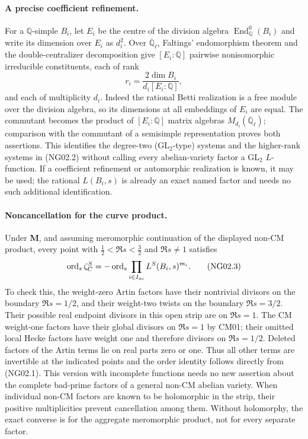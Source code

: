 \paragraph{A precise coefficient refinement.}
For a $\mathbb Q$-simple $B_i$, let $E_i$ be the centre of the division
algebra $\operatorname{End}^0_{\mathbb Q}(B_i)$ and write its dimension
over $E_i$ as $d_i^2$.  Over $\overline{\mathbb Q}_\ell$, Faltings'
endomorphism theorem and the double-centralizer decomposition give
$[E_i:\mathbb Q]$ pairwise nonisomorphic irreducible constituents, each
of rank
\[
                  r_i=\frac{2\dim B_i}{d_i[E_i:\mathbb Q]},
\]
and each of multiplicity $d_i$.  Indeed the rational Betti realization
is a free module over the division algebra, so its dimensions at all
embeddings of $E_i$ are equal.  The commutant becomes the
product of $[E_i:\mathbb Q]$ matrix algebras
$M_{d_i}(\overline{\mathbb Q}_\ell)$; comparison with the commutant of
a semisimple representation proves both assertions.  This identifies
the degree-two (GL$_2$-type) systems and the higher-rank systems in
(NG02.2) without calling every abelian-variety factor a GL$_2$
$L$-function.  If a coefficient refinement or automorphic realization
is known, it may be used; the rational $L(B_i,s)$ is already an exact
named factor and needs no such additional identification.

\paragraph{Noncancellation for the curve product.}
Under \textbf{M}, and assuming meromorphic continuation of the displayed
non-CM product, every point with
$\tfrac12<\Re s<\tfrac32$ and $\Re s\ne1$ satisfies
\[
 \operatorname{ord}_s\zeta^S_C
       =-\operatorname{ord}_s
             \prod_{i\in I_{\rm nc}}L^S(B_i,s)^{m_i}.          \tag{NG02.3}
\]
To check this, the weight-zero Artin factors have their nontrivial
divisors on the boundary $\Re s=1/2$, and their weight-two twists on
the boundary $\Re s=3/2$.  Their possible real endpoint divisors in
this open strip are on $\Re s=1$.  The CM weight-one factors have
their global divisors on $\Re s=1$ by CM01; their omitted local
Hecke factors have weight one and therefore divisors on
$\Re s=1/2$.  Deleted factors of the Artin terms lie on real parts
zero or one.  Thus all other terms are invertible at the indicated
points and the order identity follows directly from (NG02.1).
This version with incomplete functions needs no new assertion about
the complete bad-prime factors of a general non-CM abelian variety.
When individual non-CM factors are known to be holomorphic
in the strip, their positive multiplicities prevent cancellation
among them.  Without holomorphy, the exact converse is for the
aggregate meromorphic product, not for every separate factor.

